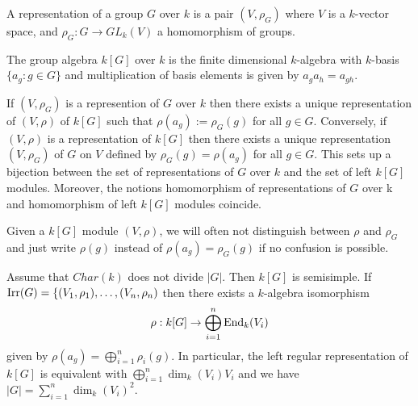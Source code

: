 \begin{defn}
A representation of a group \(G\) over \(k\) is a pair \((V,\rho _G)\) where \(V\) is a \(k\)-vector space, and \(\rho _G: G\rightarrow GL_{k}(V)\) a homomorphism of groups.
\end{defn}

\begin{defn}
The group algebra \(k[G]\) over \(k\) is the finite dimensional \(k\)-algebra with \(k\)-basis \(\{a_{g}:g\in G\}\) and multiplication of basis elements is given by \(a_{g}a_{h}=a_{gh}.\)
\end{defn}

\begin{thm}
If \((V,\rho _G)\) is a represention of \(G\) over \(k\) then there exists a unique representation of \((V,\rho )\) of \(k[G]\) such that \(\rho (a_{g}):=\rho _G(g)\) for all \(g\in G.\) Conversely, if \((V,\rho )\) is a representation of \(k[G]\) then there exists a unique representation \((V,\rho _G)\) of \(G\) on \(V\) defined by \(\rho _G(g)=\rho (a_{g})\) for all \(g\in G.\) This sets up a bijection between the set of representations of \(G\) over \(k\) and the set of left \(k[G]\) modules. Moreover, the notions homomorphism of representations of \(G\) over k and homomorphism of left \(k[G]\) modules coincide.
\end{thm}

\begin{defn}
Given a \(k[G]\) module \((V,\rho )\), we will often not distinguish between \(\rho \) and \(\rho _G\) and just write \(\rho (g)\) instead of \(\rho (a_{g})=\rho _G(g)\) if no confusion is possible.
\end{defn}

\begin{thm}
Assume that \(Char(k)\) does not divide \(|G|\). Then \(k[G]\) is semisimple. If \(\operatorname{Irr}(G)=\{(V_{1},\rho _{1}),\ldots ,(V_{n},\rho _{n})\) then there exists a \(k\)-algebra isomorphism
\[
\rho :k[G]\rightarrow \bigoplus_{i=1}^n \operatorname{End}_{k}(V_{i})
\]
given by \(\rho (a_{g})=\bigoplus_{i=1}^n\rho _{i}(g).\) In particular, the left regular representation of \(k[G]\) is equivalent with \(\bigoplus_{i=1}^n \dim_{k}(V_{i})V_{i}\) and we have \(|G|=\sum _{i=1}^n\dim_{k}(V_{i})^2.\)
\end{thm}

